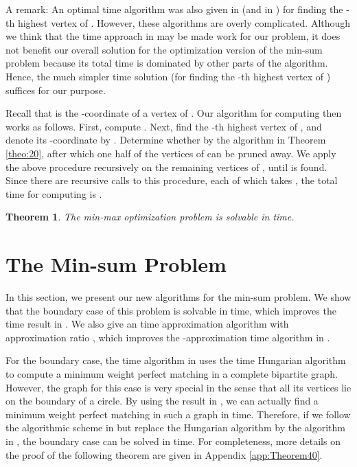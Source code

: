 \documentclass[11pt]{article}
\newtheorem{Theo}{Theorem}
\begin{document}
A remark: An optimal  time algorithm was also given in
\cite{ref:ColeAn89} (and in \cite{ref:KatzOp93}) for finding the
-th highest vertex of . However, these algorithms are overly
complicated. Although we think that the  time approach in \cite{ref:ColeAn89} may
be made work for our problem, it does not
benefit our overall solution for the optimization version of the
min-sum problem because its total time is dominated by
other parts of the algorithm. Hence, the much simpler 
time solution (for finding the -th highest vertex of )
suffices for our purpose.


Recall that  is the -coordinate of a vertex of
. Our algorithm for computing  then works as follows.
First, compute . Next, find the -th
highest vertex of , and denote its -coordinate by
. Determine whether  by the
algorithm in Theorem \ref{theo:20}, after which one half of the
vertices of  can be pruned away. We apply the above
procedure recursively on the remaining vertices of , until
 is found. Since there are  recursive calls to this procedure,
each of which takes , the
total time for computing  is .



\begin{Theo}
The min-max optimization problem is solvable in  time.
\end{Theo}


\section{The Min-sum Problem}
\label{sec:minsum}

In this section, we present our new algorithms for the min-sum problem. We show that the
boundary case of this problem is solvable in  time, which improves the
 time result in \cite{ref:TanNe10}. We also give an  time
approximation algorithm with approximation ratio ,
which improves the -approximation  time
algorithm in \cite{ref:BhattacharyaOp09}.

For the boundary case, the  time algorithm in
\cite{ref:TanNe10} uses the  time Hungarian algorithm
to compute a minimum weight perfect matching in a complete bipartite graph.
However, the graph for this case is very special in the sense that all its
vertices lie on the boundary of a circle. By using the result in \cite{ref:BussLi98},
we can actually find a minimum weight perfect matching in such a graph
in  time. Therefore, if we follow the algorithmic scheme in
\cite{ref:TanNe10} but replace the Hungarian algorithm by the algorithm in
\cite{ref:BussLi98}, the boundary case can be solved in
 time. For completeness, more details on the proof of the
following theorem are given in Appendix \ref{app:Theorem40}.
\end{document}
